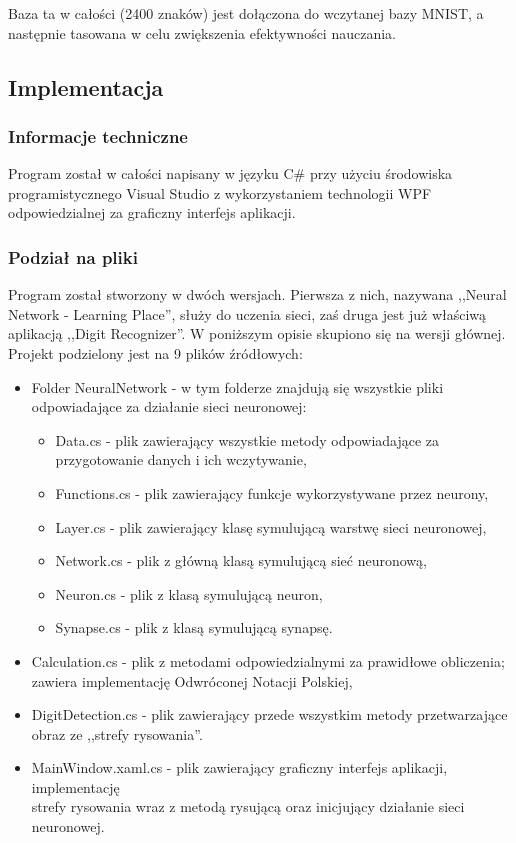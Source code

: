 \documentclass[12pt,a4paper]{article}
\begin{document}
\vspace{20pt} Baza ta w całości (2400 znaków) jest dołączona do wczytanej bazy MNIST, a następnie tasowana w celu zwiększenia efektywności nauczania.
	
\newpage	
\subsection*{Implementacja}
\subsubsection*{Informacje techniczne}
\hspace{20pt} Program został w całości napisany w języku C\# przy użyciu środowiska programistycznego Visual Studio z wykorzystaniem technologii WPF odpowiedzialnej za graficzny interfejs aplikacji.

\subsubsection*{Podział na pliki}
\hspace{20pt} Program został stworzony w dwóch wersjach. Pierwsza z nich, nazywana ,,Neural Network - Learning Place'', służy do uczenia sieci, zaś druga jest już właściwą aplikacją ,,Digit Recognizer''. W poniższym opisie skupiono się na wersji głównej. Projekt podzielony jest na 9 plików źródłowych:	
	\begin{itemize}
	\item Folder NeuralNetwork - w tym folderze znajdują się wszystkie pliki odpowiadające za działanie sieci neuronowej:
		\begin{itemize}
		\item Data.cs - plik zawierający wszystkie metody odpowiadające za przygotowanie danych i ich wczytywanie,
		\item Functions.cs - plik zawierający funkcje wykorzystywane przez neurony,
		\item Layer.cs - plik zawierający klasę symulującą warstwę sieci neuronowej,
		\item Network.cs - plik z główną klasą symulującą sieć neuronową,
		\item Neuron.cs - plik z klasą symulującą neuron,
		\item Synapse.cs - plik z klasą symulującą synapsę. 
		\end{itemize}
	\item Calculation.cs - plik z metodami odpowiedzialnymi za prawidłowe obliczenia; zawiera implementację Odwróconej Notacji Polskiej,
	\item DigitDetection.cs - plik zawierający przede wszystkim metody przetwarzające obraz ze ,,strefy rysowania''. 
	\item MainWindow.xaml.cs - plik zawierający graficzny interfejs aplikacji, implementację \\strefy rysowania wraz z metodą rysującą oraz inicjujący działanie sieci neuronowej.
	\end{itemize}		
\end{document}
